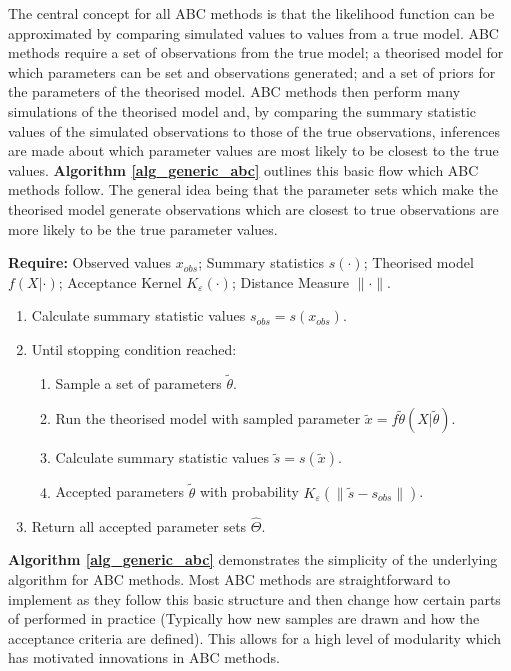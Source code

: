 \documentclass[11pt,a4paper]{article}
\theoremstyle{break}
\begin{document}
  \par The central concept for all ABC methods is that the likelihood function can be approximated by comparing simulated values to values from a true model. ABC methods require a set of observations from the true model; a theorised model for which parameters can be set and observations generated; and a set of priors for the parameters of the theorised model. ABC methods then perform many simulations of the theorised model and, by comparing  the summary statistic values of the simulated observations to those of the true observations, inferences are made about which parameter values are most likely to be closest to the true values. \textbf{Algorithm \ref{alg_generic_abc}} outlines this basic flow which ABC methods follow. The general idea being that the parameter sets which make the theorised model generate observations which are closest to true observations are more likely to be the true parameter values.

  \begin{box_algorithm}\label{alg_generic_abc}
    \textbf{Require:} Observed values $x_{obs}$; Summary statistics $s(\cdot)$; Theorised model $f(X|\cdot)$; Acceptance Kernel $K_\varepsilon(\cdot)$; Distance Measure $\|\cdot\|$.
    \begin{enumerate}
      \item Calculate summary statistic values $s_{obs}=s(x_{obs})$.
      \item Until stopping condition reached:
      \begin{enumerate}
        \item Sample a set of parameters $\tilde\theta$.
        \item Run the theorised model with sampled parameter $\tilde{x}=f\tilde\theta(X|\tilde\theta)$.
        \item Calculate summary statistic values $\tilde{s}=s(\tilde{x})$.
        \item Accepted parameters $\tilde\theta$ with probability $K_\varepsilon(\|\tilde{s}-s_{obs}\|)$.
      \end{enumerate}
      \item Return all accepted parameter sets $\hat\Theta$.
    \end{enumerate}
  \end{box_algorithm}

  \par \textbf{Algorithm \ref{alg_generic_abc}} demonstrates the simplicity of the underlying algorithm for ABC methods. Most ABC methods are straightforward to implement as they follow this basic structure and then change how certain parts of performed in practice (Typically how new samples are drawn and how the acceptance criteria are defined). This allows for a high level of modularity which has motivated innovations in ABC methods.
\end{document}

